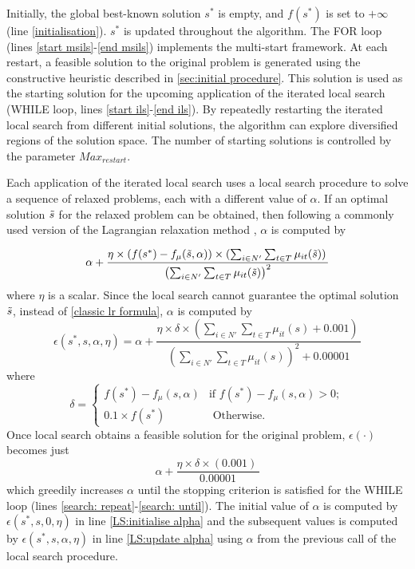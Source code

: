 \documentclass{article}
\begin{document}
Initially, the global best-known solution $s^*$ is empty, and $f(s^*)$ is set to $+\infty$ (line \ref{initialisation}). $s^*$ is updated throughout the algorithm. The FOR loop (lines \ref{start msils}-\ref{end msils}) implements the multi-start framework. At each restart, a feasible solution to the original problem is generated using the constructive heuristic described in \ref{sec:initial procedure}. This solution is used as the starting solution for the upcoming application of the iterated local search (WHILE loop, lines \ref{start ils}-\ref{end ils}). By repeatedly restarting the iterated local search from different initial solutions, the algorithm can explore diversified regions of the solution space. The number of starting solutions is controlled by the parameter $Max_{restart}$.

Each application of the iterated local search uses a local search procedure to solve a sequence of relaxed problems, each with a different value of $\alpha$. If an optimal solution $\Tilde{s}$ for the relaxed problem can be obtained, then following a commonly used version of the Lagrangian relaxation method \cite{fisher1981lagrangian}, $\alpha$ is computed by 

\begin{equation}
\alpha + \frac{\eta \times (f(s^*) - f_{\mu}(\Tilde{s},\alpha)) \times (\sum_{i\in N'}\sum_{t\in T} \mu_{it}(\Tilde{s}) )\,} {\left(\sum_{i\in N'}\sum_{t\in T} \mu_{it}(\Tilde{s}) \right)^2}  \label{classic lr formula}
\end{equation}
where $\eta$ is a scalar. Since the local search cannot guarantee the optimal solution $\Tilde{s}$, instead of \eqref{classic lr formula}, $\alpha$ is computed by 
\begin{equation}
\epsilon(s^*, s, \alpha, \eta) = \alpha + \frac{\eta \times \delta \times (\sum_{i\in N'}\sum_{t\in T} \mu_{it}(s) + 0.001)\,} {\left(\sum_{i\in N'}\sum_{t\in T} \mu_{it}(s) \right)^2+ 0.00001}  \label{epsilon}
\end{equation} where
\begin{equation*}    
\delta= \left\{ \begin{array}{ll}
  		f(s^*) - f_{\mu}(s,\alpha)  & \mbox{if $f(s^*) - f_{\mu}(s,\alpha) >0$}; \\
 		 0.1\times f(s^*)& \mbox{ Otherwise.} 
  \end{array}\right. 
\end{equation*}
Once local search obtains a feasible solution for the original problem, $\epsilon(\cdot)$ becomes just 
\begin{equation*}
\alpha + \frac{\eta \times \delta \times ( 0.001)\,} { 0.00001} 
\end{equation*} 
 which greedily increases $\alpha$ until the stopping criterion is satisfied for the WHILE loop (lines \ref{search: repeat}-\ref{search: until}). The initial value of $\alpha$ is computed by $\epsilon (s^*, s, 0, \eta)$ in line \ref{LS:initialise alpha} and the subsequent values is computed by $\epsilon (s^*, s, \alpha, \eta)$ in line \ref{LS:update alpha} using $\alpha$ from the previous call of the local search procedure.  
\end{document}
